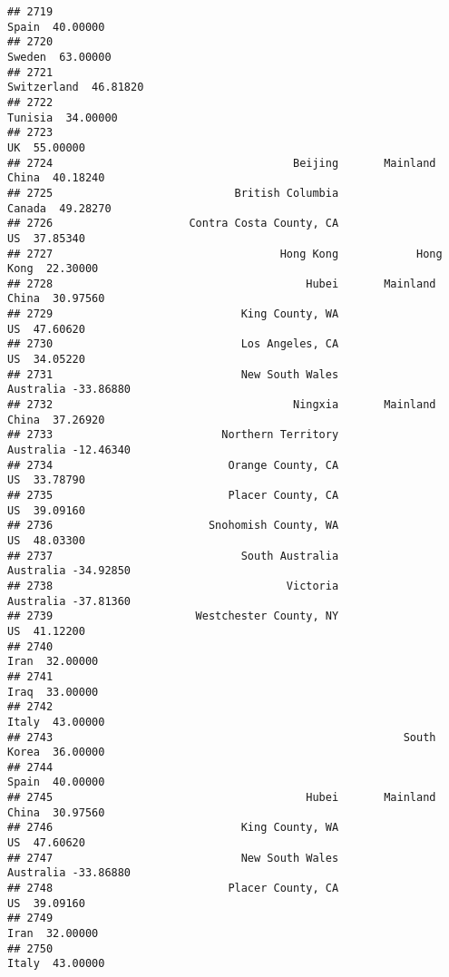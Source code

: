 \documentclass[
]{article}
\begin{document}
\begin{verbatim}
## 2719                                                            Spain  40.00000
## 2720                                                           Sweden  63.00000
## 2721                                                      Switzerland  46.81820
## 2722                                                          Tunisia  34.00000
## 2723                                                               UK  55.00000
## 2724                                     Beijing       Mainland China  40.18240
## 2725                            British Columbia               Canada  49.28270
## 2726                     Contra Costa County, CA                   US  37.85340
## 2727                                   Hong Kong            Hong Kong  22.30000
## 2728                                       Hubei       Mainland China  30.97560
## 2729                             King County, WA                   US  47.60620
## 2730                             Los Angeles, CA                   US  34.05220
## 2731                             New South Wales            Australia -33.86880
## 2732                                     Ningxia       Mainland China  37.26920
## 2733                          Northern Territory            Australia -12.46340
## 2734                           Orange County, CA                   US  33.78790
## 2735                           Placer County, CA                   US  39.09160
## 2736                        Snohomish County, WA                   US  48.03300
## 2737                             South Australia            Australia -34.92850
## 2738                                    Victoria            Australia -37.81360
## 2739                      Westchester County, NY                   US  41.12200
## 2740                                                             Iran  32.00000
## 2741                                                             Iraq  33.00000
## 2742                                                            Italy  43.00000
## 2743                                                      South Korea  36.00000
## 2744                                                            Spain  40.00000
## 2745                                       Hubei       Mainland China  30.97560
## 2746                             King County, WA                   US  47.60620
## 2747                             New South Wales            Australia -33.86880
## 2748                           Placer County, CA                   US  39.09160
## 2749                                                             Iran  32.00000
## 2750                                                            Italy  43.00000

\end{verbatim}
\end{document}
